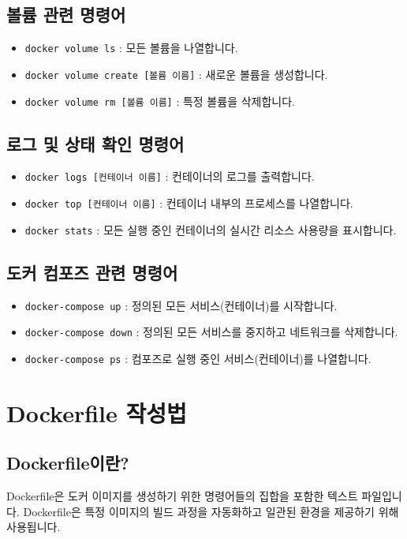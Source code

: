 \documentclass{article}
\begin{document}
\subsection*{볼륨 관련 명령어}
\begin{itemize}
    \item \texttt{docker volume ls} : 모든 볼륨을 나열합니다.
    \item \texttt{docker volume create [볼륨 이름]} : 새로운 볼륨을 생성합니다.
    \item \texttt{docker volume rm [볼륨 이름]} : 특정 볼륨을 삭제합니다.
\end{itemize}

\subsection*{로그 및 상태 확인 명령어}
\begin{itemize}
    \item \texttt{docker logs [컨테이너 이름]} : 컨테이너의 로그를 출력합니다.
    \item \texttt{docker top [컨테이너 이름]} : 컨테이너 내부의 프로세스를 나열합니다.
    \item \texttt{docker stats} : 모든 실행 중인 컨테이너의 실시간 리소스 사용량을 표시합니다.
\end{itemize}

\subsection*{도커 컴포즈 관련 명령어}
\begin{itemize}
    \item \texttt{docker-compose up} : 정의된 모든 서비스(컨테이너)를 시작합니다.
    \item \texttt{docker-compose down} : 정의된 모든 서비스를 중지하고 네트워크를 삭제합니다.
    \item \texttt{docker-compose ps} : 컴포즈로 실행 중인 서비스(컨테이너)를 나열합니다.
\end{itemize}

\section{Dockerfile 작성법}

\subsection*{Dockerfile이란?}
Dockerfile은 도커 이미지를 생성하기 위한 명령어들의 집합을 포함한 텍스트 파일입니다. Dockerfile은 특정 이미지의 빌드 과정을 자동화하고 일관된 환경을 제공하기 위해 사용됩니다.
\end{document}

